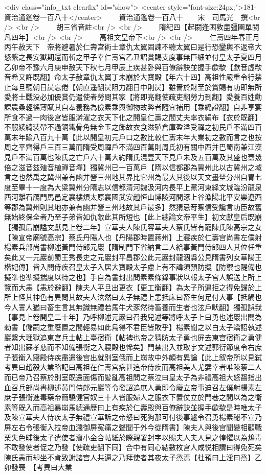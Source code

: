 <div class="info_txt clearfix" id="show">
<center style="font-size:24px;">181-資治通鑑卷一百八十</center>
  　　資治通鑑卷一百八十　　宋　司馬光　撰<br />
<br />
　　胡三省音註<br />
<br />
　　隋紀四【起閼逢困敦盡彊圉單閼凡四年】<br />
<br />
　　高祖文皇帝下<br />
<br />
　　仁壽四年春正月丙午赦天下　帝將避暑於仁壽宫術士章仇太翼固諫不聽太翼曰是行恐鑾輿不返帝大怒繫之長安獄期還而斬之甲子幸仁壽宫乙丑詔賞賜支度事無巨細並付皇太子夏四月乙卯帝不豫六月庚申赦天下秋七月甲辰上疾甚卧與百僚辭訣並握手歔欷【歔音虛欷音希又許既翻】命太子赦章仇太翼丁未崩於大寶殿【年六十四】高祖性嚴重令行禁止每旦聽朝日昃忘倦【朝直遥翻昃阻力翻日中則昃】雖嗇於財至於賞賜有功即無所愛將士戰没必加優賞仍遣使者勞問其家【將即亮翻使疏吏翻勞力到翻】愛養百姓勸課農桑輕徭薄賦其自奉養務為儉素乘輿御物故弊者隨宜補用【乘繩證翻】自非享宴所食不過一肉後宫皆服澣濯之衣天下化之開皇仁壽之間丈夫率衣絹布【衣於既翻】不服綾綺装帶不過銅鐵骨角無金玉之飾故衣食滋殖倉庫盈溢受禪之初民戶不滿四百萬末年踰八百九十萬【此以開皇初元戶口之數比較仁夀末年大業初之數而言之也按周之平齊得戶三百三萬而隋受周禪戶不滿四百萬則周氏初有關中西并巴蜀南兼江漢見戶不滿百萬也陳氏之亡戶六十萬大約隋氏混壹天下見戶未及五百萬及其盛也蓋幾倍之滋音兹殖音植禪音墠】獨冀州已一百萬戶【隋以信都郡為冀州此以古冀州之域言之也然禹之冀州兼有幽并營三州地其界比它州為最大其後以天文畫埜分州自胃七度至畢十一度為大梁冀州分隋志以信都清河魏汲河内長平上黨河東絳文城臨汾龍泉西河離石鴈門馬邑定襄樓煩太原襄國武安趙恒山博陵河間涿上谷漁陽北平安樂遼西等郡為冀州則其地亦兼有幽并營三州地故其戶最多】然猜忌苛察信受讒言功臣故舊無始終保全者乃至子弟皆如仇敵此其所短也【此上總論文帝平生】初文獻皇后既崩【獨孤后崩謚文獻見上卷二年】宣華夫人陳氏容華夫人蔡氏皆有寵陳氏陳高宗之女【陳宣帝廟號高宗】蔡氏丹陽人也【丹陽郡時置蔣州】上寢疾於仁壽宫尚書左僕射楊素兵部尚書柳述黃門侍郎元巖【隋制門下省納言二人給事黃門侍郎四人其位任重矣此又一元巖前蜀王秀長史之元巖封平昌郡公此元巖封龍涸縣公見隋書列女華陽王楷妃傳】皆入閤侍疾召皇太子入居大寶殿太子慮上有不諱須預防擬【防禦也隄備也擬凖也凖擬揣度以待之也】手自為書封出問素素條錄事狀以報太子宫人誤送上所上覽而大恚【恚於避翻】陳夫人平旦出更衣【更工衡翻】為太子所逼拒之得免歸於上所上怪其神色有異問其故夫人泫然曰太子無禮上恚抵床曰畜生何足付大事【抵觸也今人詈人猶曰畜生言其無識無禮若馬牛犬豕然待畜養而生者也泫戶畎翻】獨孤誤我【事見上卷開皇二十年】乃呼柳述元巖曰召我兒述等將呼太子上曰勇也述巖出閤為勑書【儲嗣之重廢置之間輕易如此烏得不君臣皆敗乎】楊素聞之以白太子矯詔執述巖繫大理獄追東宫兵士帖上臺宿衛【帖裨也帝之猜防太子勇也屏去東宫宿衛之勇健者知出蘇孝慈而不知備張衡之入寢殿也悕矣】門禁出入並取宇文述郭衍節度令右庶子張衡入寢殿侍疾盡遣後宫出就别室俄而上崩故中外頗有異論【此上叙帝所以見弑考異曰趙毅大業略記曰高祖在仁夀宫病甚追帝侍疾而高祖美人尤嬖幸者唯陳蔡二人而已帝乃召蔡於别室既還面傷而髪亂高祖問之蔡泣曰皇太子為非禮高祖大怒齧指出血召兵部尚書柳述黃門侍郎元巖等令發詔追庶人勇即令廢立帝事迫召左僕射楊素左庶子張衡進毒藥帝簡驍健官奴三十人皆服婦人之服衣下置仗立於門巷之間以為之衛素等既入而高祖暴崩馬總通歷曰上有疾於仁壽殿與百僚辭訣並握手歔欷是時唯太子及陳宣華夫人侍疾太子無禮宣華訴之帝怒曰死狗那可付後事遽令召勇楊素秘不宣乃屏左右令張衡入拉帝血濺御屏寃痛之聲聞于外今從隋書】陳夫人與後宫聞變相顧戰栗失色晡後太子遣使者齎小金合帖紙於際親署封字以賜夫人夫人見之惶懼以為鴆毒不敢發使者促之乃發【使疏吏翻下同】合中有同心結數枚宫人咸悦相謂曰得免死矣陳氏恚而却坐不肯致謝諸宫人共逼之乃拜使者其夜太子烝焉【杜預曰上淫曰烝】乙卯發喪　【考異曰大業